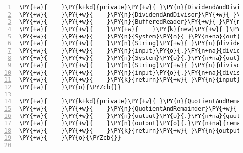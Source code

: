 \begin{Verbatim}[commandchars=\\\{\},numbers=left,firstnumber=1,stepnumber=1,frame=single,fontsize=\small]
\PY{+w}{    }\PY{k+kd}{private}\PY{+w}{ }\PY{n}{DividendAndDivisor}\PY{+w}{ }\PY{n+nf}{input}\PY{o}{(}\PY{o}{)}\PY{+w}{ }\PY{k+kd}{throws}\PY{+w}{ }\PY{n}{IOException}\PY{+w}{ }\PY{o}{\PYZob{}}
\PY{+w}{    }\PY{+w}{    }\PY{n}{DividendAndDivisor}\PY{+w}{ }\PY{n}{input}\PY{+w}{ }\PY{o}{=}\PY{+w}{ }\PY{k}{new}\PY{+w}{ }\PY{n}{DividendAndDivisor}\PY{o}{(}\PY{o}{)}\PY{o}{;}
\PY{+w}{    }\PY{+w}{    }\PY{n}{BufferedReader}\PY{+w}{ }\PY{n}{reader}\PY{+w}{ }\PY{o}{=}
\PY{+w}{    }\PY{+w}{    }\PY{+w}{    }\PY{k}{new}\PY{+w}{ }\PY{n+nf}{BufferedReader}\PY{o}{(}\PY{k}{new}\PY{+w}{ }\PY{n}{InputStreamReader}\PY{o}{(}\PY{n}{System}\PY{o}{.}\PY{n+na}{in}\PY{o}{)}\PY{o}{)}\PY{o}{;}
\PY{+w}{    }\PY{+w}{    }\PY{n}{System}\PY{o}{.}\PY{n+na}{out}\PY{o}{.}\PY{n+na}{print}\PY{o}{(}\PY{l+s}{"割られる数を入力してください："}\PY{o}{)}\PY{o}{;}
\PY{+w}{    }\PY{+w}{    }\PY{n}{String}\PY{+w}{ }\PY{n}{dividendString}\PY{+w}{ }\PY{o}{=}\PY{+w}{ }\PY{n}{reader}\PY{o}{.}\PY{n+na}{readLine}\PY{o}{(}\PY{o}{)}\PY{o}{;}
\PY{+w}{    }\PY{+w}{    }\PY{n}{input}\PY{o}{.}\PY{n+na}{dividend}\PY{+w}{ }\PY{o}{=}\PY{+w}{ }\PY{n}{Integer}\PY{o}{.}\PY{n+na}{parseInt}\PY{o}{(}\PY{n}{dividendString}\PY{o}{)}\PY{o}{;}
\PY{+w}{    }\PY{+w}{    }\PY{n}{System}\PY{o}{.}\PY{n+na}{out}\PY{o}{.}\PY{n+na}{print}\PY{o}{(}\PY{l+s}{"割る数を入力してください："}\PY{o}{)}\PY{o}{;}
\PY{+w}{    }\PY{+w}{    }\PY{n}{String}\PY{+w}{ }\PY{n}{divisorString}\PY{+w}{ }\PY{o}{=}\PY{+w}{ }\PY{n}{reader}\PY{o}{.}\PY{n+na}{readLine}\PY{o}{(}\PY{o}{)}\PY{o}{;}
\PY{+w}{    }\PY{+w}{    }\PY{n}{input}\PY{o}{.}\PY{n+na}{divisor}\PY{+w}{ }\PY{o}{=}\PY{+w}{ }\PY{n}{Integer}\PY{o}{.}\PY{n+na}{parseInt}\PY{o}{(}\PY{n}{divisorString}\PY{o}{)}\PY{o}{;}
\PY{+w}{    }\PY{+w}{    }\PY{k}{return}\PY{+w}{ }\PY{n}{input}\PY{o}{;}
\PY{+w}{    }\PY{o}{\PYZcb{}}

\PY{+w}{    }\PY{k+kd}{private}\PY{+w}{ }\PY{n}{QuotientAndRemainder}\PY{+w}{ }\PY{n+nf}{process}\PY{o}{(}\PY{n}{DividendAndDivisor}\PY{+w}{ }\PY{n}{input}\PY{o}{)}\PY{+w}{ }\PY{o}{\PYZob{}}
\PY{+w}{    }\PY{+w}{    }\PY{n}{QuotientAndRemainder}\PY{+w}{ }\PY{n}{output}\PY{+w}{ }\PY{o}{=}\PY{+w}{ }\PY{k}{new}\PY{+w}{ }\PY{n}{QuotientAndRemainder}\PY{o}{(}\PY{o}{)}\PY{o}{;}
\PY{+w}{    }\PY{+w}{    }\PY{n}{output}\PY{o}{.}\PY{n+na}{quotient}\PY{+w}{ }\PY{o}{=}\PY{+w}{ }\PY{n}{input}\PY{o}{.}\PY{n+na}{dividend}\PY{+w}{ }\PY{o}{/}\PY{+w}{ }\PY{n}{input}\PY{o}{.}\PY{n+na}{divisor}\PY{o}{;}
\PY{+w}{    }\PY{+w}{    }\PY{n}{output}\PY{o}{.}\PY{n+na}{remainder}\PY{+w}{ }\PY{o}{=}\PY{+w}{ }\PY{n}{input}\PY{o}{.}\PY{n+na}{dividend}\PY{+w}{ }\PY{o}{\PYZpc{}}\PY{+w}{ }\PY{n}{input}\PY{o}{.}\PY{n+na}{divisor}\PY{o}{;}
\PY{+w}{    }\PY{+w}{    }\PY{k}{return}\PY{+w}{ }\PY{n}{output}\PY{o}{;}
\PY{+w}{    }\PY{o}{\PYZcb{}}


\end{Verbatim}
